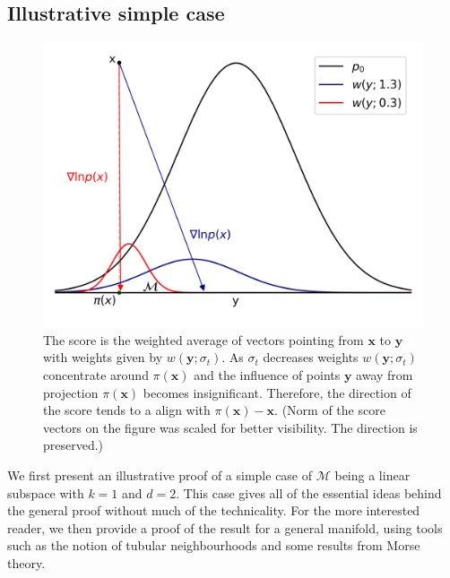 \subsection*{Illustrative simple case}

\begin{figure}
\centering
  \includegraphics[width=0.7\linewidth]{Chapter3/figures/explanation.png}
  \caption[Caption without FN]{The score is the weighted average of vectors pointing from $\textbf{x}$ to $\textbf{y}$ with weights given by $w(\textbf{y};\sigma_t)$. As $\sigma_t$ decreases weights $w(\textbf{y}; \sigma_t)$ concentrate around $\pi(\textbf{x})$ and the influence of points $\textbf{y}$ away from projection $\pi(\textbf{x})$ becomes insignificant. Therefore, the direction of the score tends to a align with $\pi(\textbf{x})-\textbf{x}$. (Norm of the score vectors on the figure was scaled for better visibility. The direction is preserved.)}
  \label{ch3:fig:example}
\end{figure}

We first present an illustrative proof of a simple case of $\mathcal{M}$ being a linear subspace with $k=1$ and $d=2$. This case gives all of the essential ideas behind the general proof without much of the technicality. For the more interested reader, we then provide a proof of the result for a general manifold, using tools such as the notion of tubular neighbourhoods and some results from Morse theory. 
    
